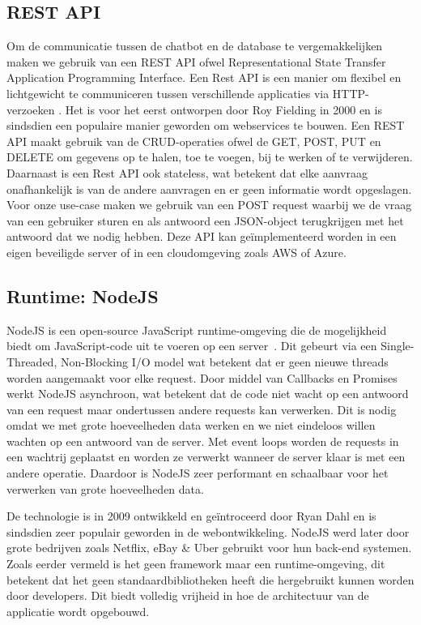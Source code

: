 \subsection{REST API}
Om de communicatie tussen de chatbot en de database te vergemakkelijken maken we gebruik van een REST API ofwel Representational State Transfer Application Programming Interface.
Een Rest API is een manier om flexibel en lichtgewicht te communiceren tussen verschillende applicaties via HTTP-verzoeken \autocite{RESTAPI2021}.
Het is voor het eerst ontworpen door Roy Fielding in 2000 en is sindsdien een populaire manier geworden om webservices te bouwen.
Een REST API maakt gebruik van de CRUD-operaties ofwel de GET, POST, PUT en DELETE om gegevens op te halen, toe te voegen, bij te werken of te verwijderen.
Daarnaast is een Rest API ook stateless, wat betekent dat elke aanvraag onafhankelijk is van de andere aanvragen en er geen informatie wordt opgeslagen.
Voor onze use-case maken we gebruik van een POST request waarbij we de vraag van een gebruiker sturen en als antwoord een JSON-object terugkrijgen met het antwoord dat we nodig hebben. 
Deze API kan geïmplementeerd worden in een eigen beveiligde server of in een cloudomgeving zoals AWS of Azure.


\subsection{Runtime: NodeJS}
NodeJS is een open-source JavaScript runtime-omgeving die de mogelijkheid biedt om JavaScript-code uit te voeren op een server~\autocite{NodeJS2022}.
Dit gebeurt via een Single-Threaded, Non-Blocking I/O model wat betekent dat er geen nieuwe threads worden aangemaakt voor elke request.
Door middel van Callbacks en Promises werkt NodeJS asynchroon, wat betekent dat de code niet wacht op een antwoord van een request maar ondertussen andere requests kan verwerken.
Dit is nodig omdat we met grote hoeveelheden data werken en we niet eindeloos willen wachten op een antwoord van de server.
Met event loops worden de requests in een wachtrij geplaatst en worden ze verwerkt wanneer de server klaar is met een andere operatie.
Daardoor is NodeJS zeer performant en schaalbaar voor het verwerken van grote hoeveelheden data.

De technologie is in 2009 ontwikkeld en geïntroceerd door Ryan Dahl en is sindsdien zeer populair geworden in de webontwikkeling. 
NodeJS werd later door grote bedrijven zoals Netflix, eBay \& Uber gebruikt voor hun back-end systemen.
Zoals eerder vermeld is het geen framework maar een runtime-omgeving, dit betekent dat het geen standaardbibliotheken heeft die hergebruikt kunnen worden door developers.
Dit biedt volledig vrijheid in hoe de architectuur van de applicatie wordt opgebouwd.

